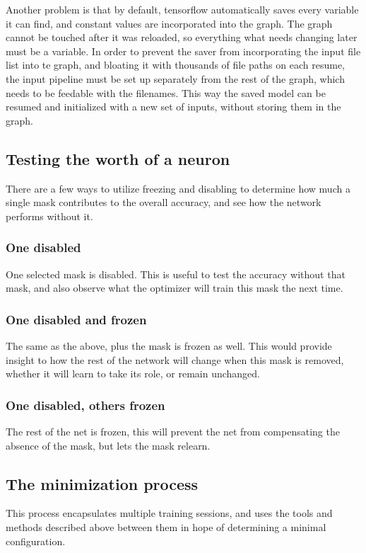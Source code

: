 \documentclass[12pt]{report}
\begin{document}
Another problem is that by default, tensorflow automatically saves every variable it can find, and constant values are incorporated into the graph. The graph cannot be touched after it was reloaded, so everything what needs changing later must be a variable. In order to prevent the saver from incorporating the input file list into te graph, and bloating it with thousands of file paths on each resume, the input pipeline must be set up separately from the rest of the graph, which needs to be feedable with the filenames. This way the saved model can be resumed and initialized with a new set of inputs, without storing them in the graph.
\subsection{Testing the worth of a neuron}
There are a few ways to utilize freezing and disabling to determine how much a single mask contributes to the overall accuracy, and see how the network performs without it.
\subsubsection{One disabled}One selected mask is disabled. This is useful to test the accuracy without that mask, and also observe what the optimizer will train this mask the next time.
\subsubsection{One disabled and frozen}The same as the above, plus the mask is frozen as well. This would provide insight to how the rest of the network will change when this mask is removed, whether it will learn to take its role, or remain unchanged.
\subsubsection{One disabled, others frozen}The rest of the net is frozen, this will prevent the net from compensating the absence of the mask, but lets the mask relearn.
\subsection{The minimization process}
This process encapsulates multiple training sessions, and uses the tools and methods described above between them in hope of determining a minimal configuration.
\end{document}
